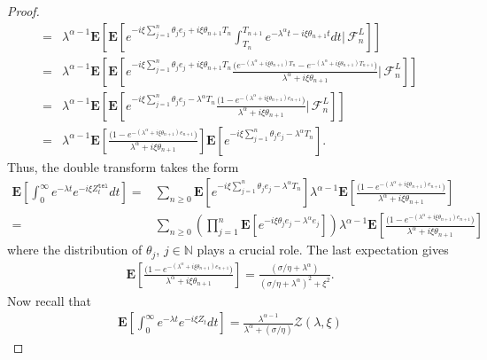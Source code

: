 \documentclass[10pt,a4paper]{article}
\numberwithin{equation}{section}
\theoremstyle{plain}
\theoremstyle{remark}
\begin{document}
\begin{proof}
\begin{align*}
= & \lambda^{\alpha-1} \mathbf{E}\left[ \mathbf{E} \left[ e^{-i\xi \sum_{j=1}^{n} \theta_j e_j + i \xi \theta_{n + 1} T_n} \int_{T_n}^{T_{n+1}} e^{ - \lambda^\alpha t- i \xi \theta_{n + 1} t } dt \bigg| \, \mathcal{F}^L_n \right] \right]\\
= & \lambda^{\alpha - 1} \mathbf{E}\left[ \mathbf{E}\left[ e^{-i\xi \sum_{j=1}^{n} \theta_j e_j + i \xi \theta_{n + 1} T_n}\frac{\big(e^{-(\lambda^\alpha + i\xi \theta_{n+1})T_{n}} - e^{-(\lambda^\alpha + i\xi \theta_{n+1}) T_{n+1}} \big)}{\lambda^\alpha + i \xi \theta_{n+1}}  \bigg| \, \mathcal{F}^L_n \right] \right]\\
= & \lambda^{\alpha - 1}  \mathbf{E}\left[ \mathbf{E}\left[ e^{-i\xi \sum_{j=1}^{n} \theta_j e_j -\lambda^\alpha T_n} \frac{\big(1 - e^{-(\lambda^\alpha + i\xi \theta_{n+1})e_{n+1}}\big)}{\lambda^\alpha + i \xi \theta_{n+1}}  \bigg| \, \mathcal{F}^L_n \right] \right]\\
= & \lambda^{\alpha - 1} \mathbf{E}\left[ \frac{\big(1 - e^{-(\lambda^\alpha + i\xi \theta_{n+1})e_{n+1}}\big)}{\lambda^\alpha + i \xi \theta_{n+1}} \right] \mathbf{E}\left[ e^{-i\xi \sum_{j=1}^{n} \theta_j e_j -\lambda^\alpha T_n}  \right].
\end{align*}
Thus, the double transform takes the form
\begin{align*}
\mathbf{E} \left[ \int_0^\infty e^{-\lambda t} e^{-i\xi Z^\mathtt{tel}_t} dt \right] 
= & \sum_{n \geq 0} \mathbf{E}\left[ e^{-i\xi \sum_{j=1}^{n} \theta_j e_j -\lambda^\alpha T_n} \right] \lambda^{\alpha -1} \mathbf{E}\left[ \frac{\big(1 - e^{-(\lambda^\alpha + i\xi \theta_{n+1})e_{n+1}}\big)}{\lambda^\alpha + i \xi \theta_{n+1}}\right]\\
= & \sum_{n \geq 0} \left( \prod_{j=1}^n \mathbf{E}\left[ e^{-i\xi \theta_j e_j -\lambda^\alpha e_j} \right]\right) \lambda^{\alpha -1} \mathbf{E}\left[ \frac{\big(1 - e^{-(\lambda^\alpha + i\xi \theta_{n+1})e_{n+1}}\big)}{\lambda^\alpha + i \xi \theta_{n+1}}\right]
\end{align*}
where the distribution of $\theta_j$, $j \in \mathbb{N}$ plays a crucial role. The last expectation gives 
\begin{align*}
\mathbf{E}\left[ \frac{\big(1 - e^{-(\lambda^\alpha + i\xi \theta_{n+1})e_{n+1}}\big)}{\lambda^\alpha + i \xi \theta_{n+1}}\right] = \frac{(\sigma/\eta + \lambda^\alpha)}{(\sigma/\eta + \lambda^\alpha)^2 + \xi^2}.
\end{align*}
Now recall that
\begin{align*}
\mathbf{E} \left[ \int_0^\infty e^{-\lambda t} e^{-i\xi Z_t} dt \right] = \frac{\lambda^{\alpha-1}}{\lambda^\alpha + (\sigma/\eta)} \mathcal{Z}(\lambda, \xi) 

\end{align*}
\end{proof}
\end{document}
